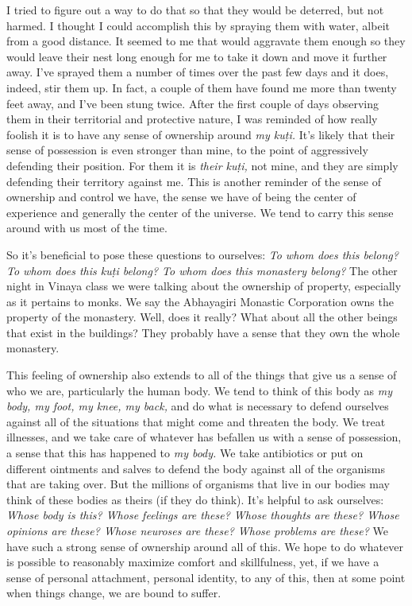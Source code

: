 I tried to figure out a way to do that so that they would be deterred, 
but not harmed. I thought I could accomplish this by spraying them with 
water, albeit from a good distance. It seemed to me that would 
aggravate them enough so they would leave their nest long enough for me 
to take it down and move it further away. I've sprayed them a number of 
times over the past few days and it does, indeed, stir them up. In 
fact, a couple of them have found me more than twenty feet away, and 
I've been stung twice. After the first couple of days observing them in 
their territorial and protective nature, I was reminded of how really 
foolish it is to have any sense of ownership around \emph{my kuṭi.} 
It's likely that their sense of possession is even stronger than mine, 
to the point of aggressively defending their position. For them it is 
\emph{their kuṭi,} not mine, and they are simply defending their 
territory against me. This is another reminder of the sense of 
ownership and control we have, the sense we have of being the center of 
experience and generally the center of the universe. We tend to carry 
this sense around with us most of the time.

So it's beneficial to pose these questions to ourselves: \emph{To whom 
does this belong? To whom does this kuṭi belong? To whom does this 
monastery belong?} The other night in Vinaya class we were talking 
about the ownership of property, especially as it pertains to monks. We 
say the Abhayagiri Monastic Corporation owns the property of the 
monastery. Well, does it really? What about all the other beings that 
exist in the buildings? They probably have a sense that they own the 
whole monastery.

This feeling of ownership also extends to all of the things that give us
a sense of who we are, particularly the human body. We tend to think of
this body as \emph{my body, my foot, my knee, my back,} and do what is
necessary to defend ourselves against all of the situations that might
come and threaten the body. We treat illnesses, and we take care of
whatever has befallen us with a sense of possession, a sense that this
has happened to \emph{my body.} We take antibiotics or put on different
ointments and salves to defend the body against all of the organisms
that are taking over. But the millions of organisms that live in our
bodies may think of these bodies as theirs (if they do think).  It's
helpful to ask ourselves: \emph{Whose body is this? Whose feelings are
these? Whose thoughts are these? Whose opinions are these? Whose
neuroses are these? Whose problems are these?} We have such a strong
sense of ownership around all of this. We hope to do whatever is
\mbox{possible} to reasonably maximize comfort and skillfulness, yet, if
we have a sense of personal attachment, personal identity, to any of
this, then at some point when things change, we are bound to suffer.

